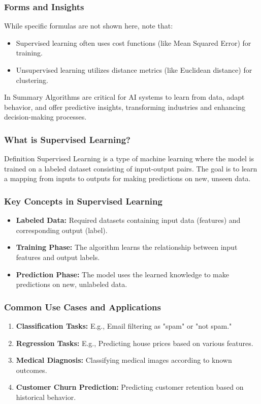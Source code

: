 \documentclass{beamer}
\begin{document}
\begin{frame}[fragile]
    \frametitle{Forms and Insights}
    While specific formulas are not shown here, note that:
    \begin{itemize}
        \item Supervised learning often uses cost functions (like Mean Squared Error) for training.
        \item Unsupervised learning utilizes distance metrics (like Euclidean distance) for clustering.
    \end{itemize}
    \begin{block}{In Summary}
        Algorithms are critical for AI systems to learn from data, adapt behavior, and offer predictive insights, transforming industries and enhancing decision-making processes.
    \end{block}
\end{frame}

\begin{frame}[fragile]
    \frametitle{What is Supervised Learning?}
    \begin{block}{Definition}
        Supervised Learning is a type of machine learning where the model is trained on a labeled dataset consisting of input-output pairs. The goal is to learn a mapping from inputs to outputs for making predictions on new, unseen data.
    \end{block}
\end{frame}

\begin{frame}[fragile]
    \frametitle{Key Concepts in Supervised Learning}
    \begin{itemize}
        \item \textbf{Labeled Data:} Required datasets containing input data (features) and corresponding output (label).
        \item \textbf{Training Phase:} The algorithm learns the relationship between input features and output labels.
        \item \textbf{Prediction Phase:} The model uses the learned knowledge to make predictions on new, unlabeled data.
    \end{itemize}
\end{frame}

\begin{frame}[fragile]
    \frametitle{Common Use Cases and Applications}
    \begin{enumerate}
        \item \textbf{Classification Tasks:} E.g., Email filtering as "spam" or "not spam."
        \item \textbf{Regression Tasks:} E.g., Predicting house prices based on various features.
        \item \textbf{Medical Diagnosis:} Classifying medical images according to known outcomes.
        \item \textbf{Customer Churn Prediction:} Predicting customer retention based on historical behavior.
    \end{enumerate}
\end{frame}
\end{document}

